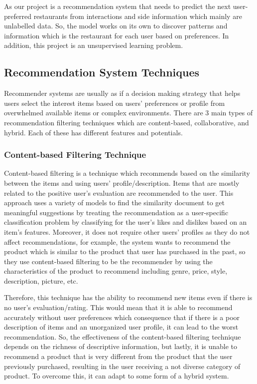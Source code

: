 \documentclass[12pt,oneside,openright,a4paper]{cpe-english-project}
\begin{document}
As our project is a recommendation system that needs to predict the next user-preferred restaurants from interactions and side information which mainly are unlabelled data. So, the model works on its own to discover patterns and information which is the restaurant for each user based on preferences. In addition, this project is an unsupervised learning problem.


\subsection{Recommendation System Techniques}

Recommender systems are usually as if a decision making strategy that helps users select the interest items based on users’ preferences or profile from overwhelmed available items or complex environments. There are 3 main types of recommendation filtering techniques which are content-based, collaborative, and hybrid. Each of these has different features and potentials.

\subsubsection{Content-based Filtering Technique}

Content-based filtering is a technique which recommends based on the similarity between the items and using users’ profile/description. Items that are mostly related to the positive user’s evaluation are recommended to the user. This approach uses a variety of models to find the similarity document to get meaningful suggestions by treating the recommendation as a user-specific classification problem by classifying for the user's likes and dislikes based on an item's features. \cite{Collaborativefiltering} Moreover, it does not require other users’ profiles as they do not affect recommendations, for example, the system wants to recommend the product which is similar to the product that user has purchased in the past, so they use content-based filtering to be the recommender by using the characteristics of the product to recommend including genre, price, style, description, picture, etc.

Therefore, this technique has the ability to recommend new items even if there is no user’s evaluation/rating. This would mean that it is able to recommend accurately without user preferences which consequence that if there is a poor description of items and an unorganized user profile, it can lead to the worst recommendation. So, the effectiveness of the content-based filtering technique depends on the richness of descriptive information, but lastly, it is unable to recommend a product that is very different from the product that the user previously purchased, resulting in the user receiving a not diverse category of product. To overcome this, it can adapt to some form of a hybrid system.
\end{document}

